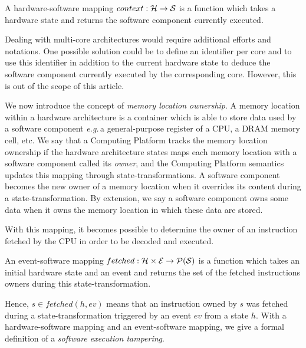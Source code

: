 \begin{definition}
  \label{def:hardsoftmap}
  A hardware-software mapping $con\-text : \mathcal{H} \rightarrow \mathcal{S}$ is a
  function which takes a hardware state and returns the software component
  currently executed.
\end{definition}

Dealing with multi-core architectures would require additional efforts and
notations. One possible solution could be to define an identifier per core and
to use this identifier in addition to the current hardware state to deduce the
software component currently executed by the corresponding core. However, this
is out of the scope of this article.

We now introduce the concept of \textit{memory location ownership}. A memory
location within a hardware architecture is a container which is able to store
data used by a software component \emph{e.g.}\,a general-purpose register of a
CPU, a DRAM memory cell, etc. We say that a Computing Platform tracks the memory
location ownership if the hardware architecture states maps each memory location
with a software component called its \emph{owner}, and the Computing Platform
semantics updates this mapping through state-transformations. A software
component becomes the new owner of a memory location when it overrides its
content during a state-transformation. By extension, we say a software component
owns some data when it owns the memory location in which these data are stored.

With this mapping, it becomes possible to determine the owner of an instruction
fetched by the CPU in order to be decoded and executed.

\begin{definition}
  \label{def:evsoft}
  An event-software mapping
  $fet\-ched: \mathcal{H} \times \mathcal{E} \rightarrow \mathcal{P}(\mathcal{S})$ is a
  function which takes an initial hardware state and an event and returns the
  set of the fetched instructions owners during this state-transformation.
\end{definition}

Hence, $s \in fetched(h, ev)$ means that an instruction owned by $s$ was fetched
during a state-transformation triggered by an event $ev$ from a state $h$. With
a hardware-software mapping and an event-software mapping, we give a formal
definition of a \textit{software execution tampering}.

